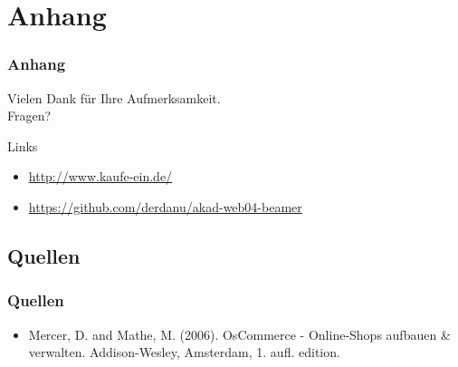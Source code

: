 \documentclass[xcolor=dvipsnames]{beamer}
\begin{document}
\section{Anhang}
\begin{frame}
  \frametitle{Anhang} %
	\begin{block}{}	
		\begin{center}
			Vielen Dank für Ihre Aufmerksamkeit. \\
			Fragen?
		\end{center}	
	\end{block}
	\begin{block}{Links}	
		\begin{itemize}
			\item \url{http://www.kaufe-ein.de/}					
			\item \url{https://github.com/derdanu/akad-web04-beamer}	
		\end{itemize}
	\end{block}
\end{frame}

\subsection{Quellen}
\begin{frame} %
  \frametitle{Quellen} %
 	\begin{itemize}
		\item Mercer, D. and Mathe, M. (2006). OsCommerce - Online-Shops aufbauen \& verwalten. Addison-Wesley, Amsterdam, 1. aufl. edition.
	\end{itemize}
\end{frame}
\end{document}
